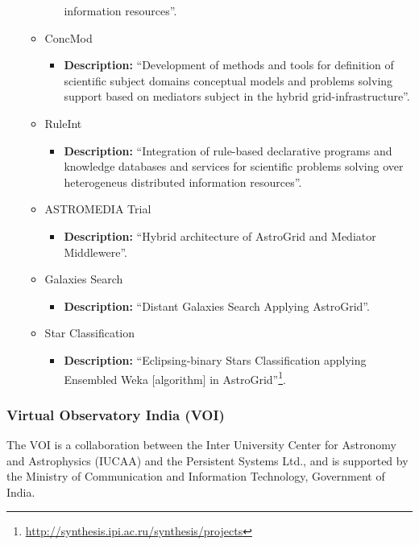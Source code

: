 \begin{itemize}
\begin{itemize}
\begin{itemize}
information resources''.
\end{itemize}
\item ConcMod
\begin{itemize}
\item \textbf{Description:} ``Development of methods and tools for definition of
scientific subject domains conceptual models and problems solving support based
on mediators subject in the hybrid grid-infrastructure''.
\end{itemize}
\item RuleInt
\begin{itemize}
\item \textbf{Description:} ``Integration of rule-based declarative programs and
knowledge databases and services for scientific problems solving over
heterogeneus distributed information resources''.
\end{itemize}
\item ASTROMEDIA Trial
\begin{itemize}
\item \textbf{Description:} ``Hybrid architecture of AstroGrid and Mediator
Middlewere''.
\end{itemize}
\item Galaxies Search
\begin{itemize}
\item \textbf{Description:} ``Distant Galaxies Search Applying AstroGrid''.
\end{itemize}
\item Star Classification
\begin{itemize}
\item \textbf{Description:} ``Eclipsing-binary Stars Classification applying
Ensembled Weka [algorithm] in
AstroGrid''\footnote{\url{http://synthesis.ipi.ac.ru/synthesis/projects}}.
\end{itemize}
\end{itemize}
\end{itemize}

\subsubsection{Virtual Observatory India (VOI)}
The VOI \cite{website:voi-home} is a collaboration between the Inter University
Center for Astronomy and Astrophysics (IUCAA) and the Persistent Systems Ltd.,
and is supported by the Ministry of Communication and Information Technology,
Government of India.

